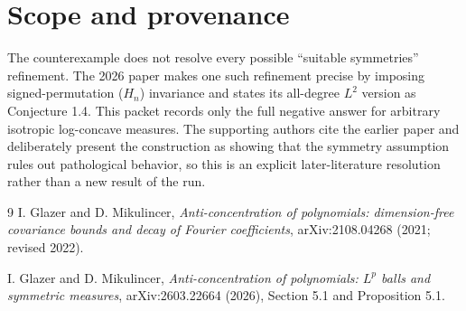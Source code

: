 \documentclass[11pt]{article}
\begin{document}
\section*{Scope and provenance}

The counterexample does not resolve every possible ``suitable symmetries'' refinement.  The 2026 paper makes one such refinement precise by imposing signed-permutation ($H_n$) invariance and states its all-degree $L^2$ version as Conjecture 1.4.  This packet records only the full negative answer for arbitrary isotropic log-concave measures.  The supporting authors cite the earlier paper and deliberately present the construction as showing that the symmetry assumption rules out pathological behavior, so this is an explicit later-literature resolution rather than a new result of the run.

\begin{thebibliography}{9}
I. Glazer and D. Mikulincer,
\emph{Anti-concentration of polynomials: dimension-free covariance bounds and decay of Fourier coefficients},
arXiv:2108.04268 (2021; revised 2022).

I. Glazer and D. Mikulincer,
\emph{Anti-concentration of polynomials: $L^p$ balls and symmetric measures},
arXiv:2603.22664 (2026), Section 5.1 and Proposition 5.1.
\end{thebibliography}
\end{document}
